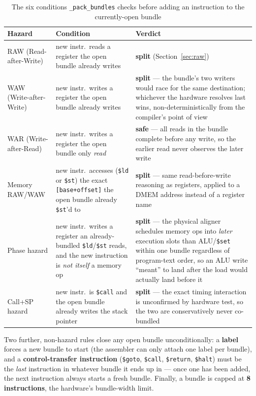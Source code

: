 \documentclass[11pt,a4paper]{article}
\begin{document}
\begin{table}[h]
\centering
\caption{The six conditions \texttt{\_pack\_bundles} checks before adding an instruction to the currently-open bundle}
\small
\begin{tabular}{@{}p{2.6cm}p{4.4cm}p{5.8cm}@{}}
\toprule
Hazard & Condition & Verdict \\
\midrule
RAW (Read-after-Write) & new instr.\ reads a register the open bundle already writes & \textbf{split} (Section~\ref{sec:raw}) \\
WAW (Write-after-Write) & new instr.\ writes a register the open bundle already writes & \textbf{split} --- the bundle's two writers would race for the same destination; whichever the hardware resolves last wins, non-deterministically from the compiler's point of view \\
WAR (Write-after-Read) & new instr.\ writes a register the open bundle only \emph{read} & \textbf{safe} --- all reads in the bundle complete before any write, so the earlier read never observes the later write \\
Memory RAW/WAW & new instr.\ accesses (\texttt{\$ld} or \texttt{\$st}) the exact \texttt{[base+offset]} the open bundle already \texttt{\$st}'d to & \textbf{split} --- same read-before-write reasoning as registers, applied to a DMEM address instead of a register name \\
Phase hazard & new instr.\ writes a register an already-bundled \texttt{\$ld}/\texttt{\$st} reads, and the new instruction is \emph{not itself} a memory op & \textbf{split} --- the physical aligner schedules memory ops into \emph{later} execution slots than ALU/\texttt{\$set} within one bundle regardless of program-text order, so an ALU write ``meant'' to land after the load would actually land before it \\
Call+SP hazard & new instr.\ is \texttt{\$call} and the open bundle already writes the stack pointer & \textbf{split} --- the exact timing interaction is unconfirmed by hardware test, so the two are conservatively never co-bundled \\
\bottomrule
\end{tabular}
\end{table}

Two further, non-hazard rules close any open bundle unconditionally: a \textbf{label}
forces a new bundle to start (the assembler can only attach one label per bundle), and a
\textbf{control-transfer instruction} (\texttt{\$goto}, \texttt{\$call}, \texttt{\$return},
\texttt{\$halt}) must be the \emph{last} instruction in whatever bundle it ends up in ---
once one has been added, the next instruction always starts a fresh bundle. Finally, a
bundle is capped at \textbf{8 instructions}, the hardware's bundle-width limit.
\end{document}
